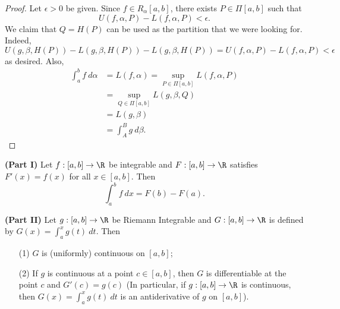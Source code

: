 \begin{proof}
    Let \( \epsilon > 0  \) be given. Since \( f \in {R}_{\alpha}[a,b] \), there exists \( P \in \Pi[a,b] \) such that 
    \[  U(f,\alpha,P) - L(f,\alpha,P) < \epsilon. \]
    We claim that \( Q = H(P) \) can be used as the partition that we were looking for. Indeed, 
    \[  U(g, \beta, H(P)) - L(g, \beta, H(P)) - L(g, \beta, H(P)) = U(f,\alpha,P) - L(f,\alpha,P) < \epsilon \]
    as desired.
    Also, 
    \begin{align*}
        \int_{ a }^{ b }  f  \ d \alpha &= L(f,\alpha) = \sup_{P \in \Pi [a,b]} L(f,\alpha,P) \\
                                        &= \sup_{Q \in \Pi[a,b]} L(g,\beta,Q) \\
                                        &= L(g,\beta) \\
                                        &= \int_{ A }^{ B }  g  \ d \beta.
    \end{align*}
\end{proof}

\begin{theorem}
    \textbf{(Part I)} Let \( f : [a,b] \to \R  \) be integrable and \( F: [a,b] \to \R  \) satisfies \( F'(x) = f(x) \) for all \( x \in [a,b] \). Then
    \[  \int_{ a }^{ b }  f  \ d x = F(b) - F(a). \]

    \textbf{(Part II)} Let \( g : [a,b] \to \R  \) be Riemann Integrable and \( G: [a,b] \to \R  \) is defined by \( G(x) = \displaystyle \int_{ a }^{ x }  g(t) \ dt  \). Then
    \begin{enumerate}
        \item[(1)] \( G  \) is (uniformly) continuous on \( [a,b] \);
        \item[(2)] If \( g  \) is continuous at a point \( c \in [a,b] \), then \( G  \) is differentiable at the point \( c  \) and \( G'(c) = g(c) \) (In particular, if \( g:[a,b] \to \R  \) is continuous, then \( G(x) = \displaystyle \int_{ a }^{ x }  g(t) \ dt  \) is an antiderivative of \( g  \) on \( [a,b] \)).
    \end{enumerate}


\end{theorem}

